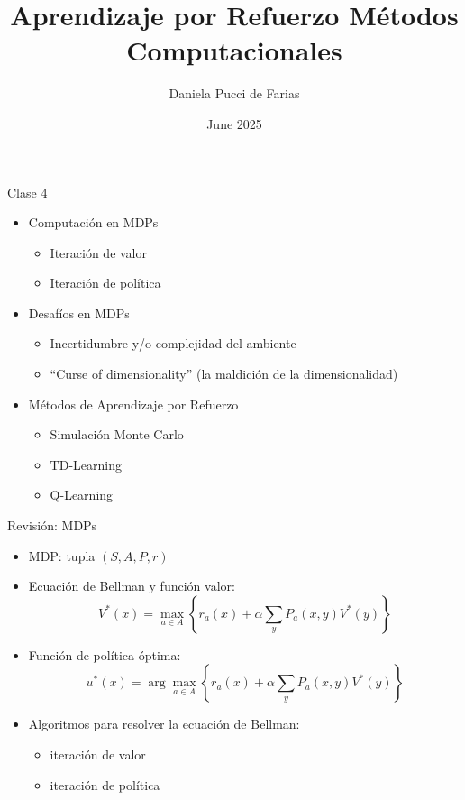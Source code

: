 \documentclass[handout]{beamer}
\title{Aprendizaje por Refuerzo \newline
Métodos Computacionales}
\author{Daniela Pucci de Farias}
\institute{Universidad Torcuato Di Tella}
\date{June 2025}
\begin{document}
\frame{\titlepage}

\begin{frame}{Clase 4}
\begin{itemize}
\item Computación en MDPs
\begin{itemize}
\item Iteración de valor
\item Iteración de política
\end{itemize}
\item<2-> Desafíos en MDPs
\begin{itemize}
\item Incertidumbre y/o complejidad del ambiente
\item “Curse of dimensionality” (la maldición de la dimensionalidad)
\end{itemize}
\item<3-> Métodos de Aprendizaje por Refuerzo
\begin{itemize}
\item Simulación Monte Carlo 
\item TD-Learning
\item Q-Learning
\end{itemize}
\end{itemize}
\end{frame}

\begin{frame}{Revisión: MDPs}
\begin{itemize}
\item MDP: tupla $(S,A, P, r)$
\item<2-> Ecuación de Bellman y función valor:
$$
V^*(x) =  \max\limits_{a \in A} 
\left\{r_a(x)+\alpha \sum_y P_a(x,y) V^*(y)\right\}
$$
\item<3-> Función de política óptima:
$$
u^*(x) =  \arg\max\limits_{a \in A} \left\{r_a(x)+\alpha \sum_y P_a(x,y) V^*(y)\right\}
$$
\item<4-> Algoritmos para resolver la ecuación de Bellman:
\begin{itemize}
    \item iteración de valor 
    \item iteración de política
\end{itemize}
\end{itemize}
\end{frame}
\end{document}
